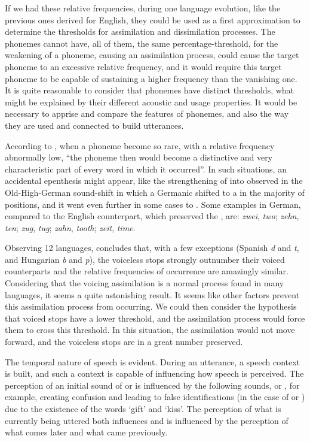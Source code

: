 If we had these relative frequencies, during one language evolution, like the previous ones derived for English, they could be used as a first approximation to determine the thresholds for assimilation and dissimilation processes. The phonemes cannot have, all of them, the same percentage-threshold, for the weakening of a phoneme, causing an assimilation process, could cause the target phoneme to an excessive relative frequency, and it would require this target phoneme to be capable of sustaining a higher frequency than the vanishing one. It is quite reasonable to consider that phonemes have distinct thresholds, what might be explained by their different acoustic and usage properties. It would be necessary to apprise and compare the features of phonemes, and also the way they are used and connected to build utterances.

According to \cite{zipf1949}, when a phoneme become so rare, with a relative frequency abnormally low, ``the phoneme then would become a distinctive and very characteristic part of every word in which it occurred''. In such situations, an accidental epenthesis might appear, like the strengthening of \textipa{[t]} into \textipa{[ts]} observed in the Old-High-German sound-shift in which a Germanic \textipa{[t]} shifted to a \textipa{[ts]} in the majority of positions, and it went even further in some cases to \textipa{[ss]}. Some examples in German, compared to the English counterpart, which preserved the \textipa{[t]}, are: \textit{zwei}, \textit{two}; \textit{zehn}, \textit{ten}; \textit{zug}, \textit{tug}; \textit{zahn}, \textit{tooth}; \textit{zeit}, \textit{time}.

Observing 12 languages, \cite{zipf1949} concludes that, with a few exceptions 
(Spanish \textit{d} and \textit{t}, and Hungarian \textit{b} and \textit{p}), 
the voiceless stops strongly outnumber their voiced counterparts and the relative frequencies 
of occurrence are amazingly similar. Considering that the voicing assimilation is a normal 
process found in many languages, it seems a quite astonishing result. It seems like other factors 
prevent this assimilation process from occurring. We could then consider the hypothesis that voiced 
stops have a lower threshold, and the assimilation process would force them to cross this threshold. 
In this situation, the assimilation would not move forward, and the voiceless stops are in a great number 
preserved.

The temporal nature of speech is evident. During an utterance, a speech context is built, and such a context is capable of influencing how speech is perceived. The perception of an initial sound of \textipa{[k]} or \textipa{[g]} is influenced by the following sounds, \textipa{[Is]} or \textipa{[Ift]}, for example, creating confusion and leading to false identifications (in the case of \textipa{[kIft]} or \textipa{[gIs]}) due to the existence of the words `gift' and `kiss'. The perception of what is currently being uttered both influences and is influenced by the perception of what comes later and what came previously. %

